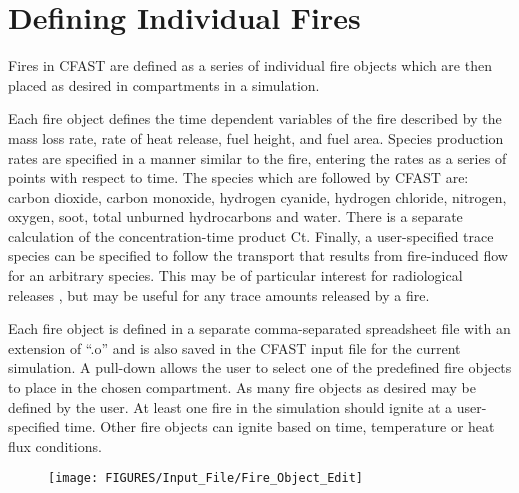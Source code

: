 \section{Defining Individual Fires}

Fires in CFAST are defined as a series of individual fire objects which are then placed as desired in compartments in a simulation.

Each fire object defines the time dependent variables of the fire described by the mass loss rate, rate of heat release, fuel height, and fuel area.  Species production rates are specified in a manner similar to the fire, entering the rates as a series of points with respect to time.  The species which are followed by CFAST are: carbon dioxide, carbon monoxide, hydrogen cyanide, hydrogen chloride, nitrogen, oxygen, soot, total unburned hydrocarbons and water. There is a separate calculation of the concentration-time product Ct. Finally, a user-specified trace species can be specified to follow the transport that results from fire-induced flow for an arbitrary species. This may be of particular interest for radiological releases \cite{Jones:2008}, but may be useful for any trace amounts released by a fire.

Each fire object is defined in a separate comma-separated spreadsheet file with an extension of ``.o'' and is also saved in the CFAST input file for the current simulation. A pull-down allows the user to select one of the predefined fire objects to place in the chosen compartment. As many fire objects as desired may be defined by the user.  At least one fire in the simulation should ignite at a user-specified time.  Other fire objects can ignite based on time, temperature or heat flux conditions.

\begin{figure}[h!]
\begin{center}
\texttt{[image: FIGURES/Input\_File/Fire\_Object\_Edit]}
\end{center}
\end{figure}

